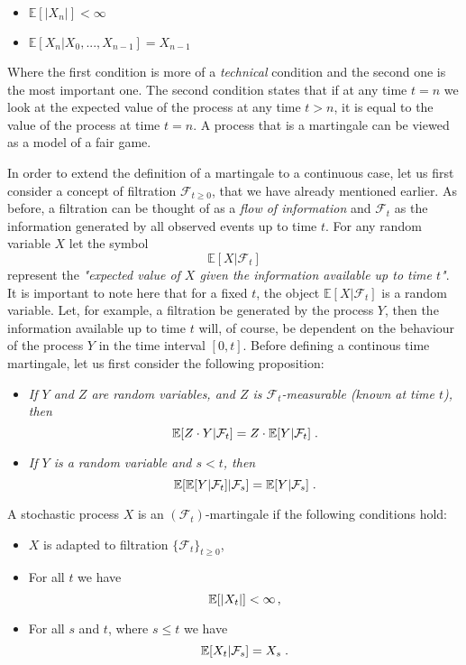 \documentclass[times, utf8, diplomski]{fer}
\begin{document}
\begin{center}
	\begin{itemize}
		\item $\mathbb{E}[|X_n|] < \infty$
		\item $\mathbb{E}[X_n | X_0, ..., X_{n-1}] = X_{n-1}$
	\end{itemize}
\end{center}

\noindent Where the first condition is more of a \textit{technical} condition and the second one is the most important one. The second condition states that if at any time $t=n$ we look at the expected value of the process at any time $t>n$, it is equal to the value of the process at time $t=n$. A process that is a martingale can be viewed as a model of a fair game.

\noindent In order to extend the definition of a martingale to a continuous case, let us first consider a concept of filtration ${\mathcal{F}}_{t \ge 0}$, that we have already mentioned earlier. As before, a filtration can be thought of as a \textit{flow of information} and $\mathcal{F}_t$ as the information generated by all observed events up to time $t$. For any random variable $X$ let the symbol
$$\mathbb{E}[X|\mathcal{F}_t]$$
represent the \textit{"expected value of $X$ given the information available up to time $t$"}. It is important to note here that for a fixed $t$, the object $\mathbb{E}[X|\mathcal{F}_t]$ is a random variable. Let, for example, a filtration be generated by the process $Y$, then the information available up to time $t$ will, of course, be dependent on the behaviour of the process $Y$ in the time interval $[0,t]$. Before defining a continous time martingale, let us first consider the following proposition:

\begin{itemize}
	\item \textit{If $Y$ and $Z$ are random variables, and $Z$ is $\mathcal{F}_t$-measurable (known at time $t$), then} $$\mathbb{E}[Z\cdot Y|\mathcal{F}_t] = Z \cdot \mathbb{E}[Y|\mathcal{F}_t]\hspace{0.1cm}.$$
	\item \textit{If $Y$ is a random variable and $s<t$, then} $$\mathbb{E}[\mathbb{E}[Y|\mathcal{F}_t]|\mathcal{F}_s] = \mathbb{E}[Y|\mathcal{F}_s]\hspace{0.1cm}.$$
\end{itemize}

\begin{definition}
A stochastic process $X$ is an $(\mathcal{F}_t)$-martingale if the following conditions hold:
\begin{itemize}
	\item $X$ is adapted to filtration $\{\mathcal{F}_t\}_{t\geq 0}$,
	\item For all $t$ we have $$\mathbb{E}[|X_t|] < \infty \hspace{0.05cm},$$
	\item For all $s$ and $t$, where $s\leq t$ we have $$\mathbb{E}[X_t|\mathcal{F}_s] = X_s\hspace{0.1cm}.$$
\end{itemize}
\end{definition}
\end{document}
